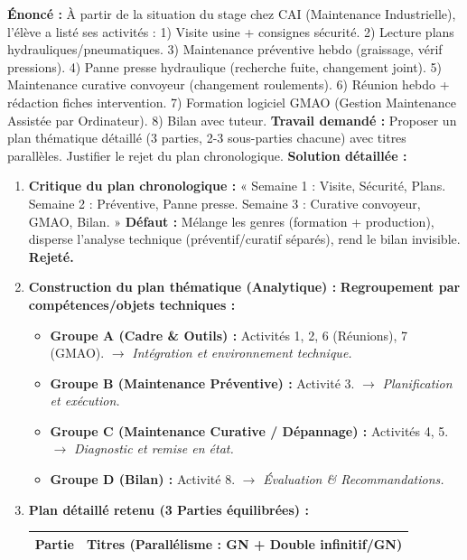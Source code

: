 \documentclass[11pt]{article}
\begin{document}
\begin{exoresolu}
    \textbf{Énoncé :} À partir de la situation du stage chez CAI (Maintenance Industrielle), l'élève a listé ses activités : 1) Visite usine + consignes sécurité. 2) Lecture plans hydrauliques/pneumatiques. 3) Maintenance préventive hebdo (graissage, vérif pressions). 4) Panne presse hydraulique (recherche fuite, changement joint). 5) Maintenance curative convoyeur (changement roulements). 6) Réunion hebdo + rédaction fiches intervention. 7) Formation logiciel GMAO (Gestion Maintenance Assistée par Ordinateur). 8) Bilan avec tuteur.
    \textbf{Travail demandé :} Proposer un plan thématique détaillé (3 parties, 2-3 sous-parties chacune) avec titres parallèles. Justifier le rejet du plan chronologique.
    \tcblower
    \textbf{Solution détaillée :}
    \begin{enumerate}
        \item \textbf{Critique du plan chronologique :} « Semaine 1 : Visite, Sécurité, Plans. Semaine 2 : Préventive, Panne presse. Semaine 3 : Curative convoyeur, GMAO, Bilan. »
        \textbf{Défaut :} Mélange les genres (formation + production), disperse l'analyse technique (préventif/curatif séparés), rend le bilan invisible. \textbf{Rejeté.}
        \item \textbf{Construction du plan thématique (Analytique) :}
        \textbf{Regroupement par compétences/objets techniques :}
        \begin{itemize}
            \item \textbf{Groupe A (Cadre \& Outils) :} Activités 1, 2, 6 (Réunions), 7 (GMAO). $\rightarrow$ \emph{Intégration et environnement technique.}
            \item \textbf{Groupe B (Maintenance Préventive) :} Activité 3. $\rightarrow$ \emph{Planification et exécution.}
            \item \textbf{Groupe C (Maintenance Curative / Dépannage) :} Activités 4, 5. $\rightarrow$ \emph{Diagnostic et remise en état.}
            \item \textbf{Groupe D (Bilan) :} Activité 8. $\rightarrow$ \emph{Évaluation \& Recommandations.}
        \end{itemize}
        \item \textbf{Plan détaillé retenu (3 Parties équilibrées) :}
        \begin{center}
            \begin{tabularx}{\linewidth}{|c|X|}\hline
            \rowcolor{popblueL} \textbf{Partie} & \textbf{Titres (Parallélisme : GN + Double infinitif/GN)} \\\hline

\end{tabularx}
\end{center}
\end{enumerate}
\end{exoresolu}
\end{document}
